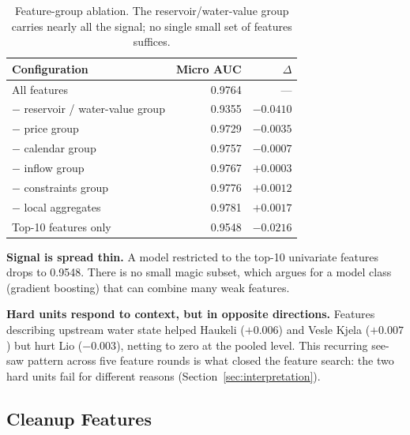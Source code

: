 \documentclass{article}
\begin{document}
\begin{table}[h]
    \centering
    \begin{tabular}{lrr}
        \hline
        Configuration & Micro AUC & $\Delta$ \\
        \hline
        All features & 0.9764 & --- \\
        $-$ reservoir / water-value group & 0.9355 & $-0.0410$ \\
        $-$ price group & 0.9729 & $-0.0035$ \\
        $-$ calendar group & 0.9757 & $-0.0007$ \\
        $-$ inflow group & 0.9767 & $+0.0003$ \\
        $-$ constraints group & 0.9776 & $+0.0012$ \\
        $-$ local aggregates & 0.9781 & $+0.0017$ \\
        Top-10 features only & 0.9548 & $-0.0216$ \\
        \hline
    \end{tabular}
    \caption{Feature-group ablation. The reservoir/water-value group
    carries nearly all the signal; no single small set of features
    suffices.}
    \label{tab:ablation}
\end{table}

\textbf{Signal is spread thin.} A model restricted to the top-10
univariate features drops to 0.9548. There is no small magic subset,
which argues for a model class (gradient boosting) that can combine many
weak features.

\textbf{Hard units respond to context, but in opposite directions.}
Features describing upstream water state helped Haukeli ($+0.006$) and
Vesle Kjela ($+0.007$) but hurt Lio ($-0.003$), netting to zero at the
pooled level. This recurring see-saw pattern across five feature rounds
is what closed the feature search: the two hard units fail for different
reasons (Section~\ref{sec:interpretation}).

\subsection{Cleanup Features}
\label{sec:cleanup}
\end{document}
